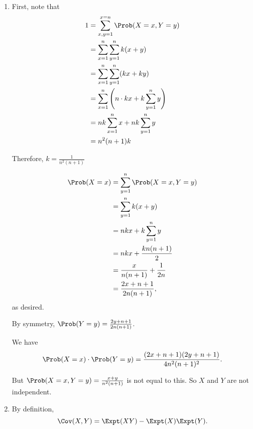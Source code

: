 \Question{\currfilebase}

\begin{enumerate}
    \item First, note that
    \begin{align*}
        1 &= \sum_{x, y = 1}^{x = n} \Prob(X = x, Y = y)\\
        &= \sum_{x = 1}^{n} \sum_{y = 1}^{n} k(x + y)\\
        &= \sum_{x = 1}^{n} \sum_{y = 1}^{n} (kx + ky)\\
        &= \sum_{x = 1}^{n} \left(n \cdot kx + k\sum_{y = 1}^{n} y\right)\\
        &= nk\sum_{x = 1}^{n} x + nk\sum_{y = 1}^{n} y\\
        &= n^2 (n+1) k
    \end{align*}
    
    Therefore, \(k = \frac{1}{n^2(n+1)}\)

    \begin{align*}
        \Prob(X = x) &= \sum_{y = 1}^{n} \Prob(X = x, Y = y)\\
        &= \sum_{y = 1}^{n} k(x + y)\\
        &= nkx + k\sum_{y = 1}^{n} y\\
        &= nkx + \frac{kn(n+1)}{2}\\
        &= \frac{x}{n(n+1)} + \frac{1}{2n}\\
        &= \frac{2x + n+1}{2n(n+1)},
    \end{align*}
    as desired.

    By symmetry, \(\Prob(Y = y) = \frac{2y + n+1}{2n(n+1)}\).
    
    We have
    \[
    \Prob(X = x) \cdot \Prob(Y = y) = \frac{(2x+n+1)(2y+n+1)}{4n^2(n+1)^2}.
    \]
    
    But \(\Prob(X = x, Y = y) = \frac{x+y}{n^2(n+1)}\) is not equal to this. So \(X\) and \(Y\) are not independent.

    \item By definition,
    \[
        \Cov(X, Y) = \Expt(XY) - \Expt(X)\Expt(Y).
    \]
    

\end{enumerate}

